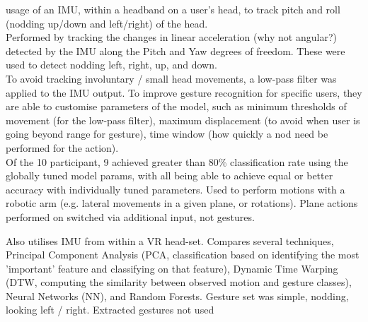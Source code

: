 
\cite{rudigkeit2015analytical} usage of an IMU, within a headband on a user's head, to track pitch and roll (nodding up/down and left/right) of the head.\\
Performed by tracking the changes in linear acceleration (why not angular?) detected by the IMU along the Pitch and Yaw degrees of freedom.
These were used to detect nodding left, right, up, and down.\\
To avoid tracking involuntary / small head movements, a low-pass filter was applied to the IMU output.
To improve gesture recognition for specific users, they are able to customise parameters of the model, such as minimum thresholds of movement (for the low-pass filter), maximum displacement (to avoid when user is going beyond range for gesture), time window (how quickly a nod need be performed for the action).\\
Of the 10 participant, 9 achieved greater than 80\% classification rate using the globally tuned model params, with all being able to achieve equal or better accuracy with individually tuned parameters.
Used to perform motions with a robotic arm (e.g. lateral movements in a given plane, or rotations). Plane actions performed on switched via additional input, not gestures.

\cite{hachaj2019evaluation} Also utilises IMU from within a VR head-set. 
Compares several techniques, Principal Component Analysis (PCA, classification based on identifying the most 'important' feature and classifying on that feature), Dynamic Time Warping (DTW, computing the similarity between observed motion and gesture classes), Neural Networks (NN), and Random Forests.
Gesture set was simple, nodding, looking left / right.
Extracted gestures not used

